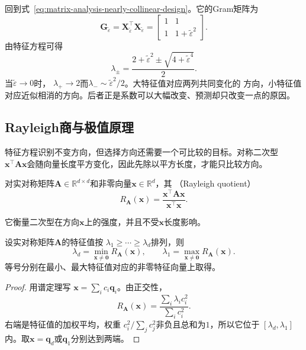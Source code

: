 回到式~\eqref{eq:matrix-analysis-nearly-collinear-design}。它的Gram矩阵为
\[
  \bm{G}_{\widetilde{\varepsilon}}=\bm{X}_{\widetilde{\varepsilon}}^{\top}\bm{X}_{\widetilde{\varepsilon}}
  =\begin{bmatrix}1&1\\1&1+\widetilde{\varepsilon}^2\end{bmatrix}.
\]
由特征方程可得
\begin{equation}
  \lambda_{\pm}
  =\frac{2+\widetilde{\varepsilon}^2\mathbin{\pm}\sqrt{4+\widetilde{\varepsilon}^4}}{2}.
  \label{eq:matrix-analysis-nearly-collinear-gram-eigenvalues}
\end{equation}
当$\widetilde{\varepsilon}\to0$时，
$\lambda_+\to2$而$\lambda_-\sim\widetilde{\varepsilon}^2/2$。大特征值对应两列共同变化的
方向，小特征值对应近似相消的方向。后者正是系数可以大幅改变、预测却只改变一点的原因。

\subsection{Rayleigh商与极值原理}

特征方程识别不变方向，但选择方向还需要一个可比较的目标。对称二次型
$\bm x^{\top}\bm A\bm x$会随向量长度平方变化，因此先除以平方长度，才能只比较方向。
\begin{definition}[Rayleigh商]
\label{def:matrix-analysis-rayleigh-quotient}
对实对称矩阵$\bm{A}\in\mathbb R^{d\times d}$和非零向量$\bm{x}\in\mathbb R^d$，其
（Rayleigh quotient）
\begin{equation}
  R_{\bm{A}}(\bm{x})
  =\frac{\bm{x}^{\top}\bm{A}\bm{x}}{\bm{x}^{\top}\bm{x}}.
  \label{eq:matrix-analysis-rayleigh-quotient}
\end{equation}
\end{definition}
它衡量二次型在方向$\bm{x}$上的强度，并且不受$\bm{x}$长度影响。

\begin{theorem}
\label{thm:matrix-analysis-rayleigh-ritz}
设实对称矩阵$\bm{A}$的特征值按
$\lambda_1\geq\cdots\geq\lambda_d$排列，则
\begin{equation}
  \lambda_d=\min_{\bm{x}\neq\bm{0}}R_{\bm{A}}(\bm{x}),
  \qquad
  \lambda_1=\max_{\bm{x}\neq\bm{0}}R_{\bm{A}}(\bm{x}).
  \label{eq:matrix-analysis-rayleigh-ritz}
\end{equation}
等号分别在最小、最大特征值对应的非零特征向量上取得。
\end{theorem}

\begin{proof}
用谱定理写
$\bm{x}=\sum_i c_i\bm{q}_i$。由正交性，
\[
  R_{\bm{A}}(\bm{x})=\frac{\sum_i\lambda_i c_i^2}{\sum_i c_i^2}.
\]
右端是特征值的加权平均，权重
$c_i^2/\sum_jc_j^2$非负且总和为$1$，所以它位于
$[\lambda_d,\lambda_1]$内。取$\bm{x}=\bm{q}_d$或$\bm{q}_1$分别达到两端。
\end{proof}

